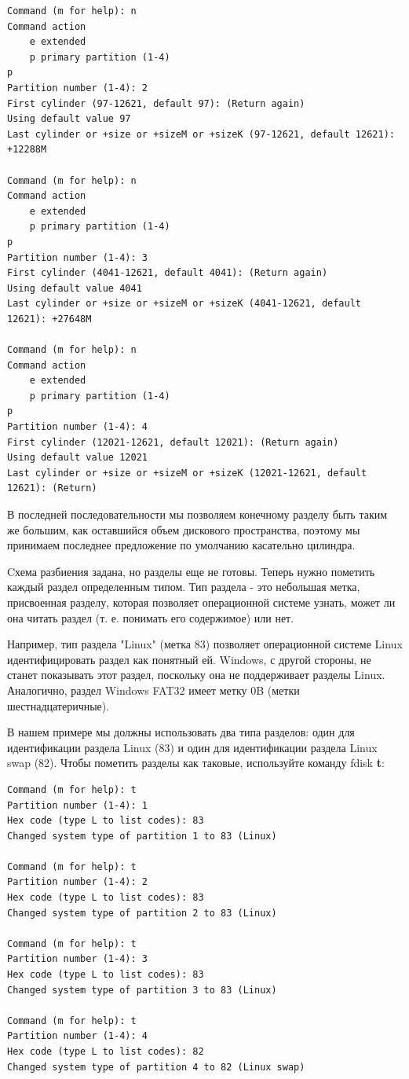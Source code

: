\documentclass[10pt]{book}
\begin{document}
\begin{tcolorbox} 
\begin{lstlisting}
Command (m for help): n
Command action
    e extended
    p primary partition (1-4)
p
Partition number (1-4): 2
First cylinder (97-12621, default 97): (Return again)
Using default value 97
Last cylinder or +size or +sizeM or +sizeK (97-12621, default 12621):
+12288M

Command (m for help): n
Command action
    e extended
    p primary partition (1-4)
p
Partition number (1-4): 3
First cylinder (4041-12621, default 4041): (Return again)
Using default value 4041
Last cylinder or +size or +sizeM or +sizeK (4041-12621, default
12621): +27648M

Command (m for help): n
Command action
    e extended
    p primary partition (1-4)
p
Partition number (1-4): 4
First cylinder (12021-12621, default 12021): (Return again)
Using default value 12021
Last cylinder or +size or +sizeM or +sizeK (12021-12621, default
12621): (Return)
\end{lstlisting}
\end{tcolorbox}

В последней последовательности мы позволяем конечному разделу быть таким же большим, как оставшийся объем дискового пространства, поэтому мы принимаем последнее предложение по умолчанию касательно цилиндра.

Cхема разбиения задана, но разделы еще не готовы. Теперь нужно пометить каждый раздел определенным типом. Тип раздела - это небольшая метка, присвоенная разделу, которая позволяет операционной системе узнать, может ли она читать раздел (т. е. понимать его содержимое) или нет.

Например, тип раздела "Linux" (метка 83) позволяет операционной системе Linux идентифицировать раздел как понятный ей. Windows, с другой стороны, не станет показывать этот раздел, поскольку она не поддерживает разделы Linux. Аналогично, раздел Windows FAT32 имеет метку 0B (метки шестнадцатеричные).

В нашем примере мы должны использовать два типа разделов: один для идентификации раздела Linux (83) и один для идентификации раздела Linux swap (82). Чтобы пометить разделы как таковые, используйте команду fdisk \textbf{t}:

\begin{tcolorbox} 
\begin{lstlisting}
Command (m for help): t
Partition number (1-4): 1
Hex code (type L to list codes): 83
Changed system type of partition 1 to 83 (Linux)

Command (m for help): t
Partition number (1-4): 2
Hex code (type L to list codes): 83
Changed system type of partition 2 to 83 (Linux)

Command (m for help): t
Partition number (1-4): 3
Hex code (type L to list codes): 83
Changed system type of partition 3 to 83 (Linux)

Command (m for help): t
Partition number (1-4): 4
Hex code (type L to list codes): 82
Changed system type of partition 4 to 82 (Linux swap)
\end{lstlisting}
\end{tcolorbox}
\end{document}
